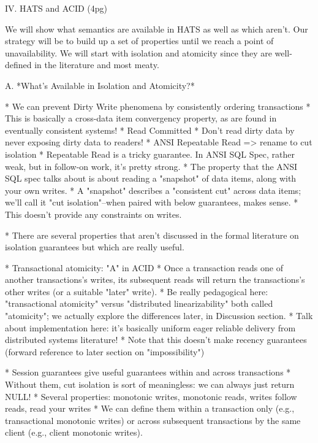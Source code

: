 
IV. HATS and ACID (4pg)

We will show what semantics are available in HATS as well as which aren't. Our strategy will be to build up a set of properties until we reach a point of unavailability. We will start with isolation and atomicity since they are well-defined in the literature and most meaty.

A. *What's Available in Isolation and Atomicity?*

* We can prevent Dirty Write phenomena by consistently ordering transactions
	* This is basically a cross-data item convergency property, as are found in eventually consistent systems!
* Read Committed
	* Don't read dirty data by never exposing dirty data to readers!
* ANSI Repeatable Read => rename to cut isolation
	* Repeatable Read is a tricky guarantee. In ANSI SQL Spec, rather weak, but in follow-on work, it's pretty strong.
	* The property that the ANSI SQL spec talks about is about reading a "snapshot" of data items, along with your own writes.
		* A "snapshot" describes a "consistent cut" across data items; we'll call it "cut isolation"--when paired with below guarantees, makes sense.
	* This doesn't provide any constraints on writes.

* There are several properties that aren't discussed in the formal literature on isolation guarantees but which are really useful.

* Transactional atomicity: "A" in ACID
	* Once a transaction reads one of another transactions's writes, its subsequent reads will return the transactions's other writes (or a suitable "later" write).
	* Be really pedagogical here: "transactional atomicity" versus "distributed linearizability" both called "atomicity"; we actually explore the differences later, in Discussion section.
	* Talk about implementation here: it's basically uniform eager reliable delivery from distributed systems literature!
	* Note that this doesn't make recency guarantees (forward reference to later section on "impossibility")

* Session guarantees give useful guarantees within and across transactions
	* Without them, cut isolation is sort of meaningless: we can always just return NULL!
	* Several properties: monotonic writes, monotonic reads, writes follow reads, read your writes
	* We can define them within a transaction only (e.g., transactional monotonic writes) or across subsequent transactions by the same client (e.g., client monotonic writes).

